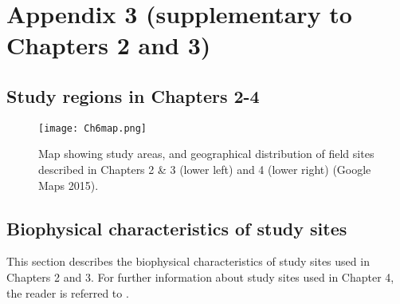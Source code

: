 \chapter[Appendix 3]{Appendix 3 (supplementary to Chapters 2 and 3)}

\section{Study regions in Chapters 2-4}

\begin{figure}[ht]
\begin{center}
\texttt{[image: Ch6map.png]} %
\caption[Map of study areas described in Chapters 2-4.]{\small{Map showing study areas, and geographical distribution of field sites described in Chapters 2 \& 3 (lower left) and 4 (lower right) (Google Maps 2015).}\label{fig:Ch6_F1}}
\end{center}
\end{figure}   
\clearpage

\section{Biophysical characteristics of study sites}

This section describes the biophysical characteristics of study sites used in Chapters 2 and 3. For further information about study sites used in Chapter 4, the reader is referred to \citep{Arthington2012}.

